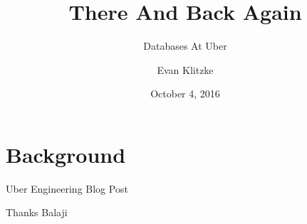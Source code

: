 \documentclass[14pt]{beamer}
\title{There And Back Again}
\subtitle{Databases At Uber}
\author{Evan Klitzke}
\date{October 4, 2016}
\begin{document}
\begin{frame}
  \titlepage
\end{frame}


\section{Background}

\begin{frame}{Uber Engineering Blog Post}
\end{frame}

\begin{frame}{Thanks Balaji}
\end{frame}
\end{document}

